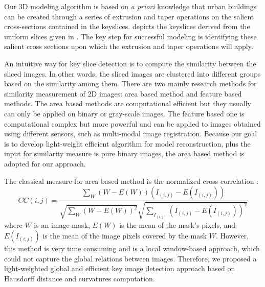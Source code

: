
\label{sec:reconst}
Our 3D modeling algorithm is based on \emph{a priori} knowledge that
urban buildings can be created through a series of extrusion and taper
operations on the salient cross-sections contained in the keyslices.
 depicts the keyslices derived from the uniform slices
given in . 
The key step for successful modeling is identifying these salient cross
sections upon which the extrusion and taper operations will apply.

An intuitive way for key slice detection is to compute the similarity between the sliced images.
In other words, the sliced images are clustered into different groups based on the similarity among them.
There are two mainly research methods for similarity measurement of 2D images: area based method and feature based
methods. The area based methods are computational efficient but they usually can only be applied on
binary or gray-scale images. The feature based one is computational complex but more powerful and can be applied
to images obtained using different sensors, such as multi-modal image registration.
Because our goal is to develop light-weight efficient algorithm for model reconstruction, plus
the input for similarity measure is pure binary images, the area based method is adopted for our approach.

The classical measure for area based method is the normalized cross
correlation \cite{DIP_Pratt}:
\begin{equation*}
CC(i,j) = \frac{\sum_W(W - E(W))(I_{(i,j)}-E(I_{(i,j)}))}
{\sqrt{\sum_W(W - E(W))^2}\sqrt{\sum_{I_{(i,j)}}(I_{(i,j)} - E(I_{(i,j)}))^2}}
\end{equation*}
where $W$ is an image mask, $E(W)$ is the mean of the mask's pixels, and $E(I_{(i,j)})$
is the mean of the image pixels covered by the mask $W$.
However, this method is very time consuming and is a local window-based approach,
which could not capture the global relations between images. Therefore, we proposed a
light-weighted global and efficient key image detection approach based on Hausdorff distance 
and curvatures computation.

